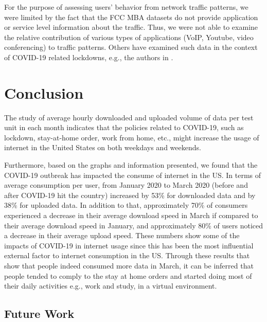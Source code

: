 \documentclass[conference,10pt]{IEEEtran}
\begin{document}
For the purpose of assessing users' behavior from network traffic patterns, we were limited by the fact that the FCC MBA datasets do not provide application or service level information about the traffic. Thus, we were not able to examine the relative contribution of various types of applications (VoIP, Youtube, video conferencing) to traffic patterns. Others have examined such data in the context of COVID-19 related lockdowns, e.g., the authors in \cite{bottger2020internet}.

\section{Conclusion}
\label{sec:conclusion}

The study of average hourly downloaded and uploaded volume of data per test unit in each month indicates that the policies related to COVID-19, such as lockdown, stay-at-home order, work from home, etc., might increase the usage of internet in the United States on both weekdays and weekends.

Furthermore, based on the graphs and information presented, we found that the COVID-19 outbreak has impacted the consume of internet in the US. In terms of average consumption per user, from January 2020 to March 2020 (before and after COVID-19 hit the country) increased by 53\% for downloaded data and by 38\% for uploaded data. In addition to that, approximately 70\% of consumers experienced a decrease in their average download speed in March if compared to their average download speed in January, and approximately 80\% of users noticed a decrease in their average upload speed. These numbers show some of the impacts of COVID-19 in internet usage since this has been the most influential external factor to internet consumption in the US. Through these results that show that people indeed consumed more data in March, it can be inferred that people tended to comply to the stay at home orders and started doing most of their daily activities e.g., work and study, in a virtual environment.

\subsection{Future Work}
\label{sec:future-work}

\end{document}
